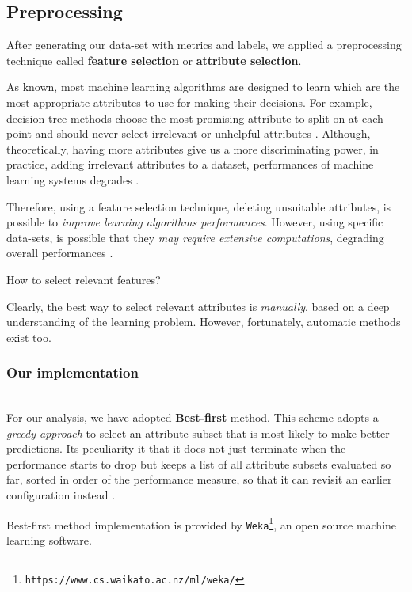 \documentclass[sigconf]{acmart}
\begin{document}
\subsection{Preprocessing}

After generating our data-set with metrics and labels, we applied a preprocessing technique called \textbf{feature selection} or \textbf{attribute selection}.

As known, most machine learning algorithms are designed to learn which are the most appropriate attributes to use for making their decisions. For example, decision tree methods choose the most promising attribute to split on at each point and should never select irrelevant or unhelpful attributes \cite{FalessiDataMining}. Although, theoretically, having more attributes give us a more discriminating power, in practice, adding irrelevant attributes to a dataset, performances of machine learning systems degrades \cite{FalessiDataMining}. 

Therefore, using a feature selection technique, deleting unsuitable attributes, is possible to \textit{improve learning algorithms performances}. However, using specific data-sets, is possible that they \textit{may require extensive computations}, degrading overall performances \cite{FalessiDataMining}.

How to select relevant features?

Clearly, the best way to select relevant attributes is \textit{manually}, based on a deep understanding of the learning problem. However, fortunately, automatic methods exist too. 

\subsubsection{Our implementation}
\hfill\\
For our analysis, we have adopted \textbf{Best-first} method. This scheme adopts a \textit{greedy approach} to select an attribute subset that is most likely to make better predictions. Its peculiarity it that it does not just terminate when the performance starts to drop but keeps a list of all attribute subsets evaluated so far, sorted in order of the performance measure, so that it can revisit an earlier configuration instead \cite{FalessiDataMining}. 

Best-first method implementation is provided by \texttt{Weka}\footnote{\texttt{https://www.cs.waikato.ac.nz/ml/weka/}}, an open source machine learning software.
\end{document}
